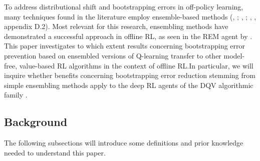 To address distributional shift and bootstrapping errors in
off-policy learning, many techniques found in the literature employ
ensemble-based methods (\citeauthor{osband2016deep},
\citeyear{osband2016deep}; \citeauthor{anschel2017averaged},
\citeyear{anschel2017averaged}; \citeauthor{pmlr-v97-fujimoto19a},
\citeyear{pmlr-v97-fujimoto19a}, appendix D.2).
Most relevant for this research,
ensembling methods have demonstrated a successful approach in
offline RL, as seen in the REM agent by
\citet{agarwal2020optimistic}. This
paper investigates to which extent results concerning bootstrapping
error prevention based on ensembled versions of Q-learning transfer to
other model-free, value-based RL algorithms in the context of offline
RL.\@ In particular, we will inquire whether benefits concerning
bootstrapping error reduction stemming from simple ensembling methods
apply to the deep RL agents of the DQV algorithmic family
\citep{sabatelli2020deep}.

\subsection{Background}
The following subsections will introduce some definitions and prior
knowledge needed to understand this paper.





